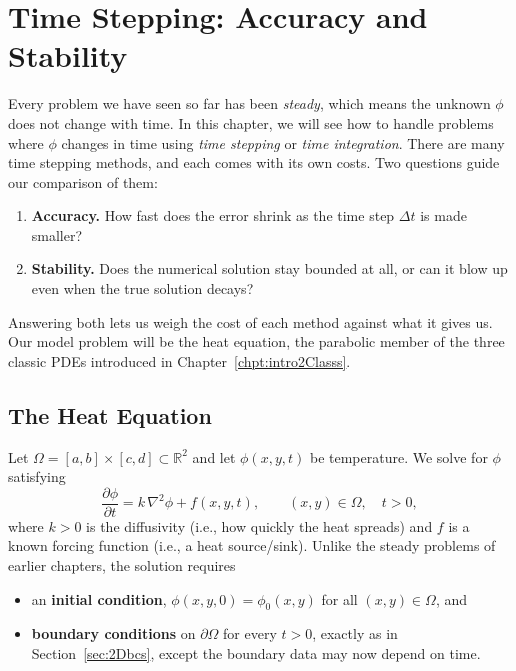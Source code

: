 \chapter{Time Stepping: Accuracy and Stability}
\label{chpt:time}

\providecommand{\TSfigplaceholder}[1]{%
  \fbox{\parbox[c][#1][c]{0.85\textwidth}{\centering\sffamily\small
  \textbf{[Figure to be added]}}}}

Every problem we have seen so far has been \emph{steady}, which means the unknown $\phi$ does not change with time. In this chapter, we will see how to handle problems where $\phi$ changes in time using
\emph{time stepping} or \emph{time integration}. There are many time stepping methods, and each comes with its own costs. Two questions guide our comparison of them:
\begin{enumerate}
  \item \textbf{Accuracy.} How fast does the error shrink as the time step $\Delta t$ is made smaller?
  \item \textbf{Stability.} Does the numerical solution stay bounded at all, or can it blow up even when the true solution decays?
\end{enumerate}
Answering both lets us weigh the cost of each method against what it gives us.
Our model problem will be the heat equation, the parabolic member of the three
classic PDEs introduced in Chapter~\ref{chpt:intro2Classs}.

\section{The Heat Equation}
\label{sec:ts-heat}

Let $\Omega = [a,b]\times[c,d]\subset\mathbb{R}^2$ and
let $\phi(x,y,t)$ be temperature. We solve for $\phi$ satisfying
\begin{equation}
  \frac{\partial \phi}{\partial t} = k\,\nabla^2\phi + f(x,y,t),
  \qquad (x,y)\in\Omega,\quad t > 0,
  \label{eq:ts-heat}
\end{equation}
where $k>0$ is the diffusivity (i.e., how quickly the heat spreads) and $f$ is a known forcing function (i.e., a heat source/sink). Unlike the
steady problems of earlier chapters, the solution requires
\begin{itemize}
  \item an \textbf{initial condition}, $\phi(x,y,0) = \phi_0(x,y)$ for all $(x,y)\in\Omega$, and
  \item \textbf{boundary conditions} on $\partial\Omega$ for every $t>0$, exactly as in
        Section~\ref{sec:2Dbcs}, except the boundary data may now depend on time.
\end{itemize}

